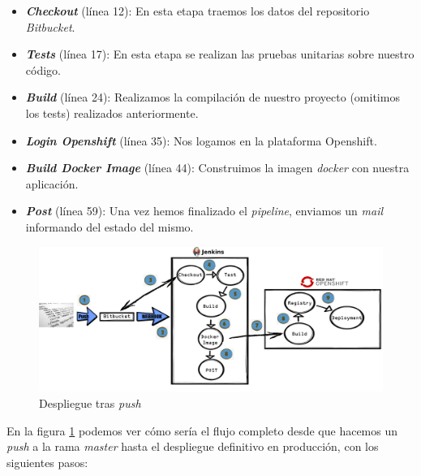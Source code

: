 \begin{itemize}
\item \textit{\textbf{Checkout}} (línea 12): En esta etapa traemos los datos del repositorio \textit{Bitbucket}. 

\item \textit{\textbf{Tests}} (línea 17): En esta etapa se realizan las pruebas unitarias sobre nuestro código.

\item \textit{\textbf{Build}} (línea 24): Realizamos la compilación de nuestro proyecto (omitimos los tests) realizados anteriormente.

\item \textit{\textbf{Login Openshift}} (línea 35): Nos logamos en la plataforma Openshift.

\item \textit{\textbf{Build Docker Image}} (línea 44): Construimos la imagen \textit{docker} con nuestra aplicación.

\item \textit{\textbf{Post}} (línea 59): Una vez hemos finalizado el \textit{pipeline}, enviamos un \textit{mail} informando del estado del mismo. 
 
\end{itemize}


\begin{figure}[!ht]
	\centering
	\includegraphics[width=1\textwidth]{images/mant/cicd_v1.png}
	\caption{Despliegue tras \textit{push}}
	\label{fig:flujocicd}
\end{figure}

En la figura \ref{fig:flujocicd} podemos ver cómo sería el flujo completo desde que hacemos un \textit{push} a la rama \textit{master} hasta el despliegue definitivo en producción, con los siguientes pasos:  

